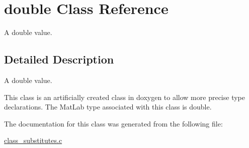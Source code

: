 \hypertarget{classdouble}{\section{double Class Reference}
\label{classdouble}
}


A double value.  




\subsection{Detailed Description}
A double value. 

This class is an artificially created class in doxygen to allow more precise type declarations. The Mat\-Lab type associated with this class is double. 

The documentation for this class was generated from the following file\-:\begin{DoxyCompactItemize}
\item 
\hyperlink{class__substitutes_8c}{class\-\_\-substitutes.\-c}\end{DoxyCompactItemize}
